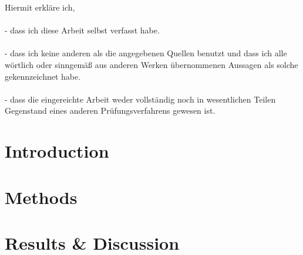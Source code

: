 








Hiermit erkl\"are ich,
\\
\\
- dass ich diese Arbeit selbst verfasst habe.
\\
\\
- dass ich keine anderen als die angegebenen Quellen benutzt und dass ich alle wörtlich oder sinngemäß aus anderen Werken \"ubernommenen Aussagen als solche gekennzeichnet habe.
\\
\\
- dass die eingereichte Arbeit weder vollst\"andig noch in wesentlichen Teilen Gegenstand eines anderen Pr\"ufungsverfahrens gewesen ist.

\newpage



\tableofcontents
\listoffigures
\listoftables
\clearpage
{}
\chapter{Introduction}



\chapter{Methods}


\chapter{Results \& Discussion}


\printbibliography



